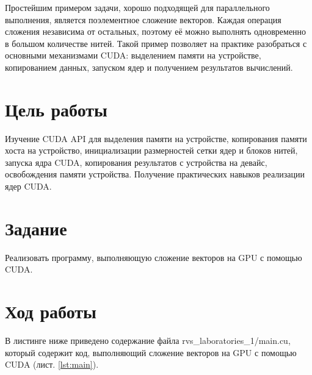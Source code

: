 \documentclass[14pt]{extarticle}
\makeatletter
\newcommand{\numbersections}{\renewcommand{\Hy@numberline}[1]{##1~}}
\let\oldsection\section
\renewcommand{\section}{\numbersections\oldsection}
\makeatother
\begin{document}
Простейшим примером задачи, хорошо подходящей для параллельного выполнения, является поэлементное сложение векторов. Каждая операция сложения независима от остальных, поэтому её можно выполнять одновременно в большом количестве нитей. Такой пример позволяет на практике разобраться с основными механизмами CUDA: выделением памяти на устройстве, копированием данных, запуском ядер и получением результатов вычислений.

\section{Цель работы}

Изучение CUDA API для выделения памяти на устройстве, копирования памяти хоста на устройство, инициализации размерностей сетки ядер и блоков нитей, запуска ядра CUDA, копирования результатов с устройства на девайс, освобождения памяти устройства. Получение практических навыков реализации ядер CUDA.

\section{Задание}

Реализовать программу, выполняющую сложение векторов на GPU с помощью CUDA.

\section{Ход работы}

В листинге ниже приведено содержание файла rvs\_laboratories\_1/main.cu, который содержит код, выполняющий сложение векторов на GPU с помощью CUDA (лист. \ref{lst:main}).
\end{document}
